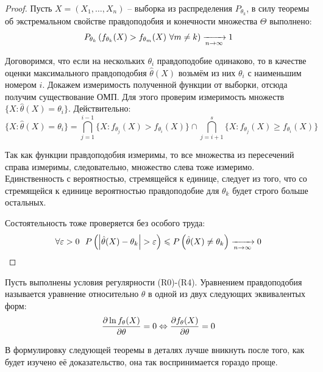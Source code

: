 \begin{proof}
    Пусть $X = (X_1, \dots, X_n)$ -- выборка из распределения $P_{\theta_k}$, в силу теоремы об экстремальном свойстве правдоподобия и конечности множества $\Theta$ выполнено:
    \[
        P_{\theta_k}\left(f_{\theta_k}(X) > f_{\theta_m}(X) \ \forall m \neq k\right) \xrightarrow[n \to \infty]{} 1
    \]

    Договоримся, что если на нескольких $\theta_i$ правдоподобие одинаково, то в качестве оценки максимального правдоподобия $\hat{\theta}(X)$ возьмём из них $\theta_i$ с наименьшим номером $i$. Докажем измеримость полученной функции от выборки, отсюда получим существование ОМП. Для этого проверим измеримость множеств $\{X \colon \hat{\theta}(X) = \theta_i\}$. Действительно:
    \[
        \{X \colon \hat{\theta}(X) = \theta_i\} = \bigcap_{j=1}^{i-1} \{X \colon f_{\theta_j}(X) > f_{\theta_i}(X)\} \cap \bigcap_{j=i+1}^s \{X \colon f_{\theta_j}(X) \ge f_{\theta_i}(X)\}
    \]

    Так как функции правдоподобия измеримы, то все множества из пересечений справа измеримы, следовательно, множество слева тоже измеримо. Единственность с вероятностью, стремящейся к единице, следует из того, что со стремящейся к единице вероятностью правдоподобие для $\theta_k$ будет строго больше остальных.

    Состоятельность тоже проверяется без особого труда:
    \[
        \forall \eps > 0 \ \ P\ps{\md{\hat{\theta}(X)-\theta_k} > \eps} \le P\ps{\hat{\theta}(X) \neq \theta_k} \xrightarrow[n \to \infty]{} 0
    \]   
\end{proof}

\begin{definition}
    Пусть выполнены условия регулярности (R0)-(R4). Уравнением правдоподобия называется уравнение относительно $\theta$ в одной из двух следующих эквивалентых форм:
    \[
        \frac{\partial \ln f_\theta(X)}{\partial \theta} = 0 \Leftrightarrow \frac{\partial f_\theta(X)}{\partial \theta} = 0
    \]
\end{definition}

\begin{note}
    В формулировку следующей теоремы в деталях лучше вникнуть после того, как будет изучено её доказательство, она так воспринимается гораздо проще.
\end{note}

